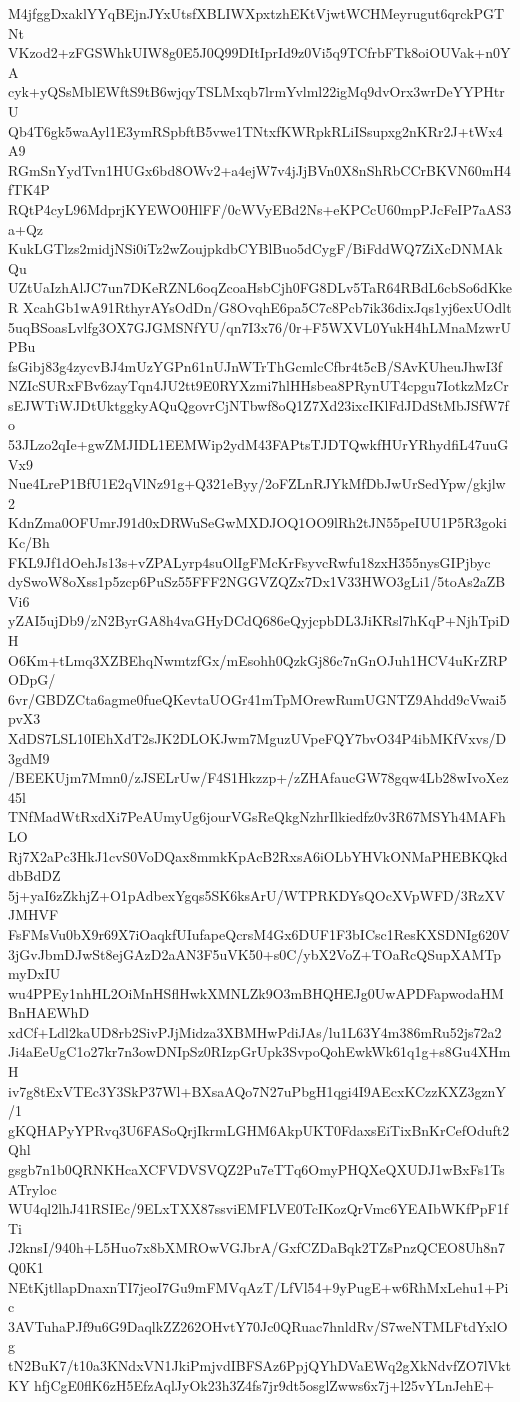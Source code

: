 M4jfggDxaklYYqBEjnJYxUtsfXBLIWXpxtzhEKtVjwtWCHMeyrugut6qrckPGTNt
VKzod2+zFGSWhkUIW8g0E5J0Q99DItIprId9z0Vi5q9TCfrbFTk8oiOUVak+n0YA
cyk+yQSsMblEWftS9tB6wjqyTSLMxqb7lrmYvlml22igMq9dvOrx3wrDeYYPHtrU
Qb4T6gk5waAyl1E3ymRSpbftB5vwe1TNtxfKWRpkRLiISsupxg2nKRr2J+tWx4A9
RGmSnYydTvn1HUGx6bd8OWv2+a4ejW7v4jJjBVn0X8nShRbCCrBKVN60mH4fTK4P
RQtP4cyL96MdprjKYEWO0HlFF/0cWVyEBd2Ns+eKPCcU60mpPJcFeIP7aAS3a+Qz
KukLGTlzs2midjNSi0iTz2wZoujpkdbCYBlBuo5dCygF/BiFddWQ7ZiXcDNMAkQu
UZtUaIzhAlJC7un7DKeRZNL6oqZcoaHsbCjh0FG8DLv5TaR64RBdL6cbSo6dKkeR
XcahGb1wA91RthyrAYsOdDn/G8OvqhE6pa5C7c8Pcb7ik36dixJqs1yj6exUOdlt
5uqBSoasLvlfg3OX7GJGMSNfYU/qn7I3x76/0r+F5WXVL0YukH4hLMnaMzwrUPBu
fsGibj83g4zycvBJ4mUzYGPn61nUJnWTrThGcmlcCfbr4t5cB/SAvKUheuJhwI3f
NZIcSURxFBv6zayTqn4JU2tt9E0RYXzmi7hlHHsbea8PRynUT4cpgu7IotkzMzCr
sEJWTiWJDtUktggkyAQuQgovrCjNTbwf8oQ1Z7Xd23ixcIKlFdJDdStMbJSfW7fo
53JLzo2qIe+gwZMJIDL1EEMWip2ydM43FAPtsTJDTQwkfHUrYRhydfiL47uuGVx9
Nue4LreP1BfU1E2qVlNz91g+Q321eByy/2oFZLnRJYkMfDbJwUrSedYpw/gkjlw2
KdnZma0OFUmrJ91d0xDRWuSeGwMXDJOQ1OO9lRh2tJN55peIUU1P5R3gokiKc/Bh
FKL9Jf1dOehJs13s+vZPALyrp4suOlIgFMcKrFsyvcRwfu18zxH355nysGIPjbyc
dySwoW8oXss1p5zcp6PuSz55FFF2NGGVZQZx7Dx1V33HWO3gLi1/5toAs2aZBVi6
yZAI5ujDb9/zN2ByrGA8h4vaGHyDCdQ686eQyjcpbDL3JiKRsl7hKqP+NjhTpiDH
O6Km+tLmq3XZBEhqNwmtzfGx/mEsohh0QzkGj86c7nGnOJuh1HCV4uKrZRPODpG/
6vr/GBDZCta6agme0fueQKevtaUOGr41mTpMOrewRumUGNTZ9Ahdd9cVwai5pvX3
XdDS7LSL10IEhXdT2sJK2DLOKJwm7MguzUVpeFQY7bvO34P4ibMKfVxvs/D3gdM9
/BEEKUjm7Mmn0/zJSELrUw/F4S1Hkzzp+/zZHAfaucGW78gqw4Lb28wIvoXez45l
TNfMadWtRxdXi7PeAUmyUg6jourVGsReQkgNzhrIlkiedfz0v3R67MSYh4MAFhLO
Rj7X2aPc3HkJ1cvS0VoDQax8mmkKpAcB2RxsA6iOLbYHVkONMaPHEBKQkddbBdDZ
5j+yaI6zZkhjZ+O1pAdbexYgqs5SK6ksArU/WTPRKDYsQOcXVpWFD/3RzXVJMHVF
FsFMsVu0bX9r69X7iOaqkfUIufapeQcrsM4Gx6DUF1F3bICsc1ResKXSDNIg620V
3jGvJbmDJwSt8ejGAzD2aAN3F5uVK50+s0C/ybX2VoZ+TOaRcQSupXAMTpmyDxIU
wu4PPEy1nhHL2OiMnHSflHwkXMNLZk9O3mBHQHEJg0UwAPDFapwodaHMBnHAEWhD
xdCf+Ldl2kaUD8rb2SivPJjMidza3XBMHwPdiJAs/lu1L63Y4m386mRu52js72a2
Ji4aEeUgC1o27kr7n3owDNIpSz0RIzpGrUpk3SvpoQohEwkWk61q1g+s8Gu4XHmH
iv7g8tExVTEc3Y3SkP37Wl+BXsaAQo7N27uPbgH1qgi4I9AEcxKCzzKXZ3gznY/1
gKQHAPyYPRvq3U6FASoQrjIkrmLGHM6AkpUKT0FdaxsEiTixBnKrCefOduft2Qhl
gsgb7n1b0QRNKHcaXCFVDVSVQZ2Pu7eTTq6OmyPHQXeQXUDJ1wBxFs1TsATryloc
WU4ql2lhJ41RSIEc/9ELxTXX87ssviEMFLVE0TcIKozQrVmc6YEAIbWKfPpF1fTi
J2knsI/940h+L5Huo7x8bXMROwVGJbrA/GxfCZDaBqk2TZsPnzQCEO8Uh8n7Q0K1
NEtKjtllapDnaxnTI7jeoI7Gu9mFMVqAzT/LfVl54+9yPugE+w6RhMxLehu1+Pic
3AVTuhaPJf9u6G9DaqlkZZ262OHvtY70Jc0QRuac7hnldRv/S7weNTMLFtdYxlOg
tN2BuK7/t10a3KNdxVN1JkiPmjvdIBFSAz6PpjQYhDVaEWq2gXkNdvfZO7lVktKY
hfjCgE0flK6zH5EfzAqlJyOk23h3Z4fs7jr9dt5osglZwws6x7j+l25vYLnJehE+
